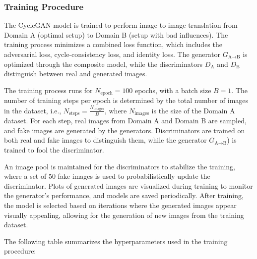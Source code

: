 \documentclass[12pt,DIV14,BCOR12mm,a4paper,footinclude=false,headinclude,parskip=half-,twoside,openright,cleardoublepage=empty,toc=index,bibliography=totoc,listof=totoc]{scrreprt}
\numberwithin{equation}{chapter}
\begin{document}
\subsubsection{Training Procedure}

The CycleGAN model is trained to perform image-to-image translation from Domain A (optimal setup) to Domain B (setup with bad influences). The training process minimizes a combined loss function, which includes the adversarial loss, cycle-consistency loss, and identity loss. The generator \( G_{\text{A} \rightarrow \text{B}} \) is optimized through the composite model, while the discriminators \( D_{\text{A}} \) and \( D_{\text{B}} \) distinguish between real and generated images.

The training process runs for \( N_{\text{epoch}} = 100 \) epochs, with a batch size \( B = 1 \). The number of training steps per epoch is determined by the total number of images in the dataset, i.e., \( N_{\text{steps}} = \frac{N_{\text{images}}}{B} \), where \( N_{\text{images}} \) is the size of the Domain A dataset. For each step, real images from Domain A and Domain B are sampled, and fake images are generated by the generators. Discriminators are trained on both real and fake images to distinguish them, while the generator \( G_{\text{A} \rightarrow \text{B}} \)) is trained to fool the discriminator.

An image pool is maintained for the discriminators to stabilize the training, where a set of $50$ fake images is used to probabilistically update the discriminator. Plots of generated images are visualized during training to monitor the generator's performance, and models are saved periodically. After training, the model is selected based on iterations where the generated images appear visually appealing, allowing for the generation of new images from the training dataset.

The following table summarizes the hyperparameters used in the training procedure:
\end{document}
